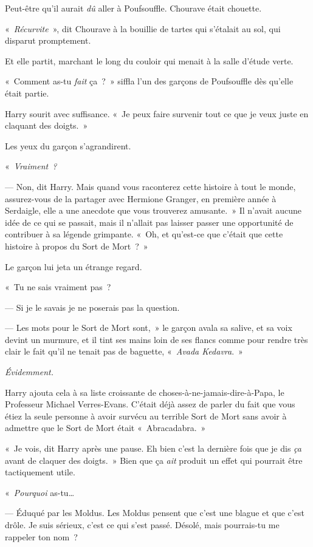 Peut-être qu'il aurait \emph{dû} aller à Poufsouffle.
Chourave était chouette.

«~\emph{Récurvite}~», dit Chourave à la bouillie de tartes qui s'étalait au sol, qui disparut promptement.

Et elle partit, marchant le long du couloir qui menait à la salle d'étude verte.

«~Comment as-tu \emph{fait} ça~?~» siffla l'un des garçons de Poufsouffle dès qu'elle était partie.

Harry sourit avec suffisance. «~Je peux faire survenir tout ce que je veux juste en claquant des doigts.~»

Les yeux du garçon s'agrandirent.

«~\emph{Vraiment~?}

--- Non, dit Harry. Mais quand vous raconterez cette histoire à tout le monde, assurez-vous de la partager avec Hermione Granger, en première année à Serdaigle, elle a une anecdote que vous trouverez amusante.~» Il n'avait aucune idée de ce qui se passait, mais il n'allait pas laisser passer une opportunité de contribuer à sa légende grimpante. «~Oh, et qu'est-ce que c'était que cette histoire à propos du Sort de Mort~?~»

Le garçon lui jeta un étrange regard.

«~Tu ne sais vraiment pas~?

--- Si je le savais je ne poserais pas la question.

--- Les mots pour le Sort de Mort sont,~» le garçon avala sa salive, et sa voix devint un murmure, et il tint ses mains loin de ses flancs comme pour rendre très clair le fait qu'il ne tenait pas de baguette, «~\emph{Avada Kedavra}.~»

\emph{Évidemment.}

Harry ajouta cela à sa liste croissante de choses-à-ne-jamais-dire-à-Papa, le Professeur Michael Verres-Evans. C'était déjà assez de parler du fait que vous étiez la seule personne à avoir survécu au terrible Sort de Mort sans avoir à admettre que le Sort de Mort était «~Abracadabra.~»

«~Je vois, dit Harry après une pause. Eh bien c'est la dernière fois que je dis \emph{ça} avant de claquer des doigts.~» Bien que ça \emph{ait} produit un effet qui pourrait être tactiquement utile.

«~\emph{Pourquoi} as-tu…

--- Éduqué par les Moldus. Les Moldus pensent que c'est une blague et que c'est drôle. Je suis sérieux, c'est ce qui s'est passé. Désolé, mais pourrais-tu me rappeler ton nom~?

